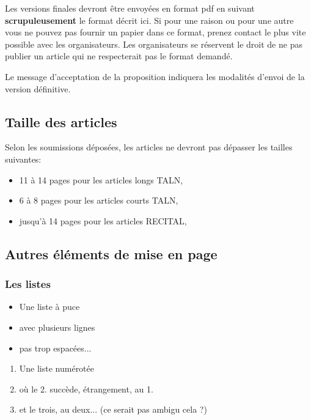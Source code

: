 \documentclass[10pt,a4paper,twoside]{article}
\begin{document}
Les versions finales devront être envoyées en format pdf en suivant \textbf{scrupuleusement} le format décrit ici. Si pour une raison ou pour une autre vous ne pouvez pas fournir un papier dans ce format, prenez contact le plus vite possible avec les organisateurs. Les organisateurs se réservent le droit de ne pas publier un article qui ne respecterait pas le format demandé.

Le message d’acceptation de la proposition indiquera les modalités d’envoi de la version définitive.

\subsection{Taille des articles}

Selon les soumissions déposées, les articles ne devront pas dépasser les tailles suivantes:

\begin{itemize}
\item 11 à 14 pages pour les articles longs TALN,
\item 6 à 8 pages pour les articles courts TALN,
\item jusqu'à 14 pages pour les articles RECITAL,

\end{itemize}

\subsection{Autres éléments de mise en page}

\subsubsection{Les listes}

\begin{itemize}
\item Une liste à puce
\item avec plusieurs lignes
\item pas trop espacées... 
\end{itemize}


\begin{enumerate}
\item Une liste numérotée
\item où le 2. succède, étrangement, au 1.
\item et le trois, au deux... (ce serait pas ambigu cela ?)
\end{enumerate}
\end{document}
